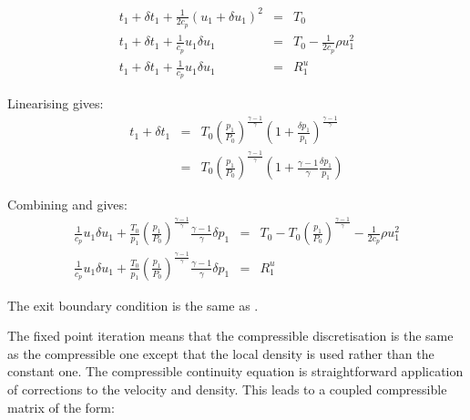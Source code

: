 \begin{equation}
  \begin{array}{rcl}
    t_1 + \delta t_1 + \frac{1}{2c_p} (u_1 + \delta u_1) ^2 &=& T_0 \\[8pt]
    t_1 + \delta t_1 + \frac{1}{c_p} u_1 \delta u_1 &=& T_0 - \frac{1}{2c_p} \rho u_1^2 \\[8pt]
    t_1 + \delta t_1 + \frac{1}{c_p} u_1 \delta u_1 &=& R^u_1
  \end{array}
  \label{eqn-comp-in-disc1}
\end{equation}

Linearising  gives:
\begin{equation}
  \begin{array}{rcl}
    t_1 + \delta t_1 &=& T_0 \left( \frac{p_1}{P_0} \right ) ^{\frac{\gamma-1}{\gamma}}
                             \left(1 + \frac{\delta p_1}{p_1} \right ) ^{\frac{\gamma-1}{\gamma}} \\[8pt]
                     &=& T_0 \left( \frac{p_1}{P_0} \right ) ^{\frac{\gamma-1}{\gamma}}
                             \left(1 + \frac{\gamma-1}{\gamma}\frac{\delta p_1}{p_1} \right )
  \end{array}
  \label{eqn-t-p-isen-3}
\end{equation}

Combining  and  gives:
\begin{equation}
  \begin{array}{rcl}
     \frac{1}{c_p} u_1 \delta u_1 + 
     \frac{T_0}{p_1} \left( \frac{p_1}{P_0} \right ) ^{\frac{\gamma-1}{\gamma}} \frac{\gamma-1}{\gamma}\delta p_1  &=&
     T_0 -T_0 \left( \frac{p_1}{P_0} \right ) ^{\frac{\gamma-1}{\gamma}} - \frac{1}{2c_p} \rho u_1^2 \\[8pt]
     \frac{1}{c_p} u_1 \delta u_1 +
     \frac{T_0}{p_1} \left( \frac{p_1}{P_0} \right ) ^{\frac{\gamma-1}{\gamma}} \frac{\gamma-1}{\gamma}\delta p_1 &=& R^u_1
  \end{array}
  \label{eqn-comp-in-disc2}
\end{equation}

The exit boundary condition is the same as .


The fixed point iteration means that the compressible discretisation is the same as the 
compressible one except that the local density is used rather than the constant one.
The compressible continuity equation is straightforward application of corrections to the
velocity and density. This leads to a coupled compressible matrix of the form:

